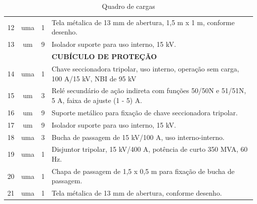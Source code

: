 \begin{table}[htbp]
\begin{sideways}
\begin{tabular}{cccl}
	       12    & uma   & 1     & Tela métalica de 13 mm de abertura, 1,5 m x 1 m, conforme desenho. \\
	       13    & um    & 9     & Isolador suporte para uso interno, 15 kV. \\
	             &       &       & \textbf{CUBÍCULO DE PROTEÇÃO} \\
	       14    & uma   & 1     & Chave seccionadora tripolar, uso interno, operação sem carga, 100 A/15 kV, NBI de 95 kV  \\
	       15    & um    & 3     & Relé secundário de ação indireta com funções 50/50N e 51/51N, 5 A, faixa de ajuste (1 - 5) A. \\
	       16    & um    & 9     & Suporte metálico para fixação de chave seccionadora tripolar. \\
	       17    & um    & 9     & Isolador suporte para uso interno, 15 kV. \\
	       18    & uma   & 3     & Bucha de passagem de 15 kV/100 A, uso interno-interno. \\
	       19    & uma   & 1     & Disjuntor tripolar, 15 kV/400 A, potência de curto 350 MVA, 60 Hz. \\
	       20    & uma   & 1     & Chapa de passagem de 1,5 x 0,5 m para fixação de bucha de passagem. \\
	       21    & uma   & 1     & Tela métalica de 13 mm de abertura,  conforme desenho. \\
	    \bottomrule
	    \end{tabular}%
	   \end{sideways}
	  \caption{Quadro de cargas}
	\end{table}%
	
